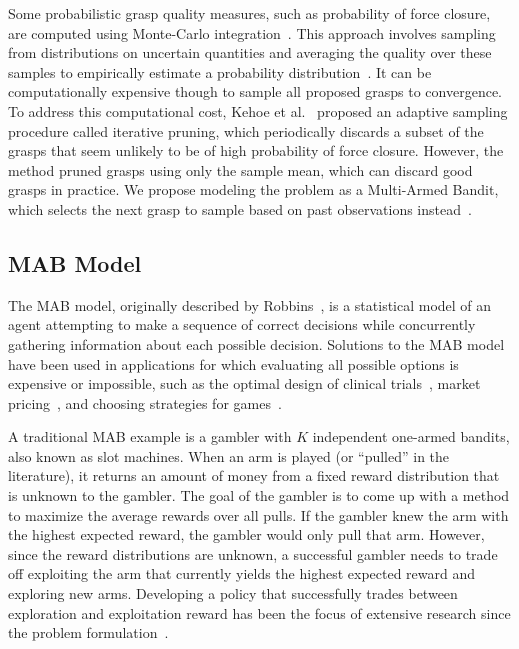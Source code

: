 \documentclass[10pt, conference]{ieeeconf}      %
\begin{document}
Some probabilistic grasp quality measures, such as probability of force closure, are computed using Monte-Carlo integration~\cite{christopoulos2007handling, kehoe2012toward, kim2012physically, weisz2012pose}.
This approach involves sampling from distributions on uncertain quantities and averaging the quality over these samples to empirically estimate a probability distribution~\cite{caflisch1998monte}.
It can be computationally expensive though to sample all proposed grasps to convergence.
To address this computational cost, Kehoe et al.~\cite{kehoe2012estimating} proposed an adaptive sampling procedure called iterative pruning, which periodically discards a subset of the grasps that seem unlikely to be of high probability of force closure. However, the method pruned grasps using only the sample mean, which can discard good grasps in practice.
We propose modeling the problem as a Multi-Armed Bandit, which selects the next grasp to sample based on past observations instead~\cite{barto1998reinforcement, lai1985asymptotically}.

\subsection{MAB Model}
The MAB model, originally described by Robbins~\cite{robbins1985some}, is a statistical model of an agent attempting to make a sequence of correct decisions while concurrently gathering information about each possible decision. Solutions to the MAB model have been used in applications for which evaluating all possible options is expensive or impossible, such as the optimal design of clinical trials~\cite{simon1989optimal}, market pricing~\cite{rothschild1974two}, and choosing strategies for games~\cite{st2012online}. 

A traditional MAB example is a gambler with $K$ independent one-armed bandits, also known as slot machines.
When an arm is played (or ``pulled'' in the literature), it returns an amount of money from a fixed reward distribution that is unknown to the gambler.
The goal of the gambler is to come up with a method to maximize the average rewards over all pulls.
If the gambler knew the arm with the highest expected reward, the gambler would only pull that arm.
However, since the reward distributions are unknown, a successful gambler needs to trade off exploiting the arm that currently yields the highest expected reward and exploring new arms.
Developing a policy that successfully trades between exploration and exploitation reward has been the focus of extensive research since the problem formulation~\cite{bergemann2006bandit,robbins1985some}.
\end{document}
